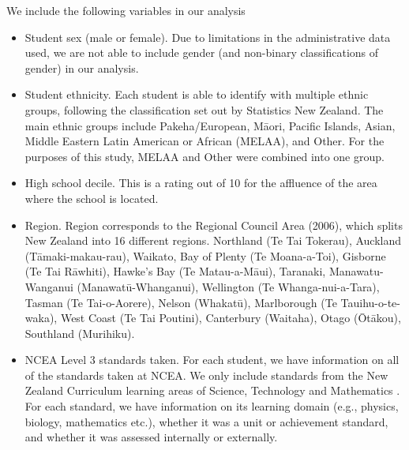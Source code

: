 We include the following variables in our analysis
\begin{itemize}
    \item Student sex (male or female). Due to limitations in the administrative data used, we are not able to include gender (and non-binary classifications of gender) in our analysis.
    \item Student ethnicity. Each student is able to identify with multiple ethnic groups, following the classification set out by Statistics New Zealand. The main ethnic groups include Pakeha/European, M\={a}ori, Pacific Islands, Asian, Middle Eastern Latin American or African (MELAA), and Other. For the purposes of this study, MELAA and Other were combined into one group.
    \item High school decile. This is a rating out of 10 for the affluence of the area where the school is located. 
    \item Region. Region corresponds to the Regional Council Area (2006), which splits New Zealand into 16 different regions. Northland (Te Tai Tokerau), Auckland (T\={a}maki-makau-rau), Waikato, Bay of Plenty (Te Moana-a-Toi), Gisborne (Te Tai R\={a}whiti), Hawke's Bay (Te Matau-a-M\={a}ui), Taranaki, Manawatu-Wanganui (Manawat\={u}-Whanganui), Wellington (Te Whanga-nui-a-Tara), Tasman (Te Tai-o-Aorere), Nelson (Whakat\={u}), Marlborough (Te Tauihu-o-te-waka), West Coast (Te Tai Poutini), Canterbury (Waitaha), Otago (\={O}t\={a}kou), Southland (Murihiku).
    \item NCEA Level 3 standards taken. For each student, we have information on all of the standards taken at NCEA. We only include standards from the New Zealand Curriculum learning areas of Science, Technology and Mathematics \cite{NZCurriculum2007}. For each standard, we have information on its learning domain (e.g., physics, biology, mathematics etc.), whether it was a unit or achievement standard, and whether it was assessed internally or externally.
\end{itemize}

